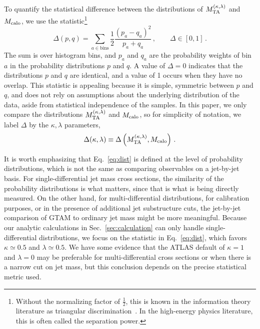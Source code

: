 \documentclass[letterpaper,11pt]{article}
\newcommand{\Sec}[1]{Sec.~\ref{#1}}
\newcommand{\Eq}[1]{Eq.~\eqref{#1}}
\begin{document}
To quantify the statistical difference between the distributions of $M_{\rm TA}^{(\kappa,\lambda)}$ and $M_{\rm calo}$, we use the statistic\footnote{Without the normalizing factor of $\tfrac{1}{2}$, this is known in the information theory literature as triangular discrimination~\cite{edseee.85070320000101}. In the high-energy physics literature, this is often called the separation power.}
\begin{equation}
\label{eq:dist}
\Delta(p,q) = \sum_{a \in \text{bins}} \frac{1}{2}\frac{(p_a-q_a)^2}{p_a+q_a}\,, \qquad \Delta \in [0,1]\,.
\end{equation}
The sum is over histogram bins, and $p_a$ and $q_a$ are the probability weights of bin $a$ in the probability distributions $p$ and $q$. 
%
A value of $\Delta = 0$ indicates that the distributions $p$ and $q$ are identical, and a value of 1 occurs when they have no overlap.
%
This statistic is appealing because it is simple, symmetric between $p$ and $q$, and does not rely on assumptions about the underlying distribution of the data, aside from statistical independence of the samples.
%
In this paper, we only compare the distributions $M_{\rm TA}^{(\kappa,\lambda)}$ and $M_{\rm calo}$, so for simplicity of notation, we label $\Delta$ by the $\kappa,\lambda$ parameters,
\begin{equation}
\label{eq:dist_kappa_lambda}
\Delta(\kappa,\lambda) \equiv \Delta \left(M_{\rm TA}^{(\kappa,\lambda)},M_{\rm calo}\right)\,.
\end{equation}

It is worth emphasizing that \Eq{eq:dist} is defined at the level of probability distributions, which is not the same as comparing observables on a jet-by-jet basis.
%
For single-differential jet mass cross sections, the similarity of the probability distributions is what matters, since that is what is being directly measured.
%
On the other hand, for multi-differential distributions, for calibration purposes, or in the presence of additional jet substructure cuts, the jet-by-jet comparison of GTAM to ordinary jet mass might be more meaningful.
%
Because our analytic calculations in \Sec{sec:calculation} can only handle single-differential distributions, we focus on the statistic in \Eq{eq:dist}, which favors $\kappa \simeq 0.5$ and $\lambda \simeq 0.5$. 
%
We have some evidence that the ATLAS default of $\kappa=1$ and $\lambda = 0$ may be preferable for multi-differential cross sections or when there is a narrow cut on jet mass, but this conclusion depends on the precise statistical metric used.
\end{document}
